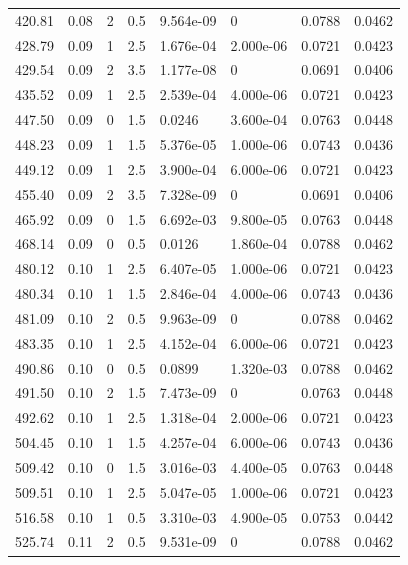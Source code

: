 \documentclass[preview]{standalone}
\begin{document}
{{{\begin{tabular}{L{1.2cm}C{1.2cm} C{0.3cm}C{0.5cm} C{1.4cm}C{1.4cm} C{1.4cm}C{1.4cm}}
  420.81  &  0.08  & 2     & 0.5 &  9.564e-09  & 0  & 0.0788 &  0.0462   \\ 
  428.79  &  0.09  & 1     & 2.5 &  1.676e-04  & 2.000e-06  & 0.0721 &  0.0423   \\ 
  429.54  &  0.09  & 2     & 3.5 &  1.177e-08  & 0  & 0.0691 &  0.0406   \\ 
  435.52  &  0.09  & 1     & 2.5 &  2.539e-04  & 4.000e-06  & 0.0721 &  0.0423   \\ 
  447.50  &  0.09  & 0     & 1.5 &  0.0246  & 3.600e-04  & 0.0763 &  0.0448   \\ 
  448.23  &  0.09  & 1     & 1.5 &  5.376e-05  & 1.000e-06  & 0.0743 &  0.0436   \\ 
  449.12  &  0.09  & 1     & 2.5 &  3.900e-04  & 6.000e-06  & 0.0721 &  0.0423   \\ 
  455.40  &  0.09  & 2     & 3.5 &  7.328e-09  & 0  & 0.0691 &  0.0406   \\ 
  465.92  &  0.09  & 0     & 1.5 &  6.692e-03  & 9.800e-05  & 0.0763 &  0.0448   \\ 
  468.14  &  0.09  & 0     & 0.5 &  0.0126  & 1.860e-04  & 0.0788 &  0.0462   \\ 
  480.12  &  0.10  & 1     & 2.5 &  6.407e-05  & 1.000e-06  & 0.0721 &  0.0423   \\ 
  480.34  &  0.10  & 1     & 1.5 &  2.846e-04  & 4.000e-06  & 0.0743 &  0.0436   \\ 
  481.09  &  0.10  & 2     & 0.5 &  9.963e-09  & 0  & 0.0788 &  0.0462   \\ 
  483.35  &  0.10  & 1     & 2.5 &  4.152e-04  & 6.000e-06  & 0.0721 &  0.0423   \\ 
  490.86  &  0.10  & 0     & 0.5 &  0.0899  & 1.320e-03  & 0.0788 &  0.0462   \\ 
  491.50  &  0.10  & 2     & 1.5 &  7.473e-09  & 0  & 0.0763 &  0.0448   \\ 
  492.62  &  0.10  & 1     & 2.5 &  1.318e-04  & 2.000e-06  & 0.0721 &  0.0423   \\ 
  504.45  &  0.10  & 1     & 1.5 &  4.257e-04  & 6.000e-06  & 0.0743 &  0.0436   \\ 
  509.42  &  0.10  & 0     & 1.5 &  3.016e-03  & 4.400e-05  & 0.0763 &  0.0448   \\ 
  509.51  &  0.10  & 1     & 2.5 &  5.047e-05  & 1.000e-06  & 0.0721 &  0.0423   \\ 
  516.58  &  0.10  & 1     & 0.5 &  3.310e-03  & 4.900e-05  & 0.0753 &  0.0442   \\ 
  525.74  &  0.11  & 2     & 0.5 &  9.531e-09  & 0  & 0.0788 &  0.0462   \\ 

\end{tabular}}}}
\end{document}
